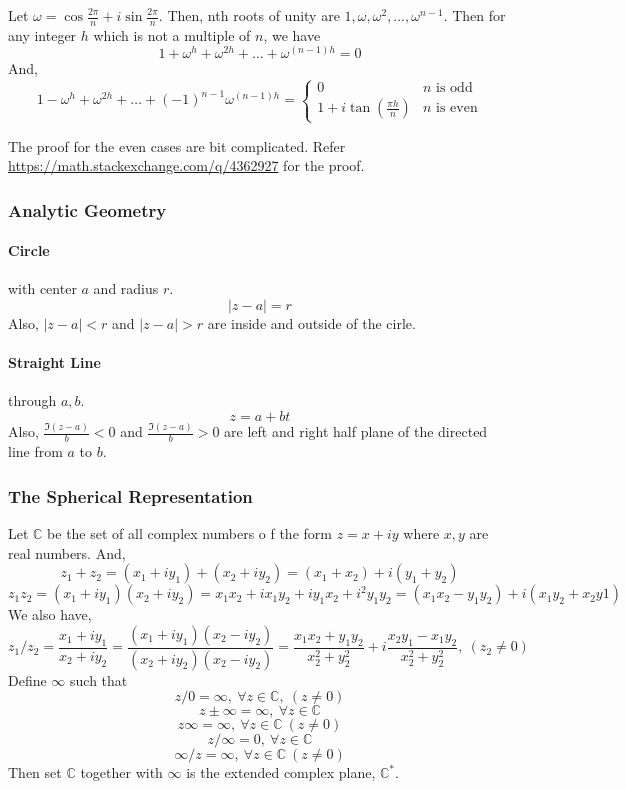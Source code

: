 Let $\omega = \cos \frac{2\pi}{n} + i\sin \frac{2\pi}{n}$.
Then, nth roots of unity are $1,\omega,\omega^2,\dots,\omega^{n-1}$.
Then for any integer $h$ which is not a multiple of $n$, we have
\begin{equation}
	1+\omega^h + \omega^{2h} + \dots + \omega^{(n-1)h} = 0
\end{equation}
And,
\begin{equation}
	1-\omega^h + \omega^{2h} + \dots + (-1)^{n-1}\omega^{(n-1)h} = \begin{cases} 0 & n \text{ is odd } \\ 1+i\tan(\frac{\pi h}{n}) & n \text{ is even} \end{cases}
\end{equation}
\begin{commentary}
	The proof for the even cases are bit complicated.
	Refer \url{https://math.stackexchange.com/q/4362927} for the proof.
\end{commentary}

\subsubsection{Analytic Geometry}
\paragraph{Circle} with center $a$ and radius $r$.
\begin{equation}
	|z-a| = r
\end{equation}
Also, $|z-a| < r$ and $|z-a| > r$ are inside and outside of the cirle.
\paragraph{Straight Line} through $a,b$.
\begin{equation}
	z = a+bt
\end{equation}
Also, $\frac{\Im{(z-a)}}{b} < 0$ and $\frac{\Im{(z-a)}}{b} > 0$ are left and right half plane of the directed line from $a$ to $b$.
\subsubsection{The Spherical Representation}
\begin{definition}
	Let $\mathbb{C}$ be the set of all complex numbers o f the form $z = x+iy$ where $x,y$ are real numbers.
	And,
	\[ z_1+z_2 = (x_1+iy_1) + (x_2+iy_2) = (x_1+x_2) + i (y_1+y_2) \]
	\[ z_1 z_2 = (x_1+iy_1) (x_2+iy_2) = x_1x_2 + ix_1y_2 + iy_1x_2 + i^2y_1y_2 = (x_1x_2-y_1y_2) + i(x_1y_2+x_2y1) \]
	We also have,
	\[ z_1/z_2 = \frac{x_1+iy_1}{x_2+iy_2} = \frac{(x_1+iy_1)(x_2-iy_2)}{(x_2+iy_2)(x_2-iy_2)} = \frac{x_1x_2+y_1y_2}{x_2^2+y_2^2}+i\frac{x_2y_1-x_1y_2}{x_2^2+y_2^2},\ (z_2 \ne 0) \]
	Define $\infty$ such that
	\[ z/0 = \infty,\ \forall z \in \mathbb{C},\ (z \ne 0)\]
	\[ z \pm \infty = \infty,\ \forall z \in \mathbb{C} \]
	\[ z \infty = \infty,\ \forall z \in \mathbb{C}\ (z \ne 0) \]
	\[ z / \infty = 0,\ \forall z \in \mathbb{C} \]
	\[ \infty/z = \infty,\ \forall z \in \mathbb{C}\ (z \ne 0) \]
	Then set $\mathbb{C}$ together with $\infty$ is the extended complex plane, $\mathbb{C}^\ast$.
\end{definition}

